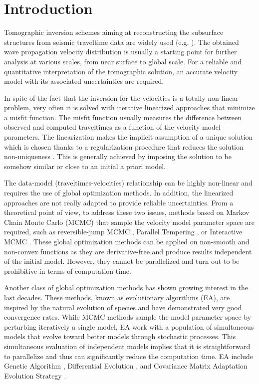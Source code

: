\def\thefigures{chap4_tomographie/figures}


\section{Introduction}
\label{sec:introduction}

Tomographic inversion schemes aiming at reconstructing the subsurface structures from seismic traveltime data are widely used (e.g. \cite{Rawlinson2010}). The obtained wave propagation velocity distribution is usually a starting point for further analysis at various scales, from near surface to global scale. For a reliable and quantitative interpretation of the tomographic solution, an accurate velocity model with its associated uncertainties are required.

In spite of the fact that the inversion for the velocities is a totally non-linear problem, very often it is solved with iterative linearized approaches that minimize a misfit function. The misfit function usually measures the difference between observed and computed traveltimes as a function of the velocity model parameters. The linearization makes the implicit assumption of a unique solution which is chosen thanks to a regularization procedure that reduces the solution non-uniqueness \citep{Menke2012}. This is generally achieved by imposing the solution to be somehow similar or close to an initial a priori model.

The data-model (traveltimes-velocities) relationship can be highly non-linear and requires the use of global optimization methods. In addition, the linearized approaches are not really adapted to provide reliable uncertainties. From a theoretical point of view, to address these two issues, methods based on Markov Chain Monte Carlo (MCMC) that sample the velocity model parameter space are required, such as reversible-jump MCMC \citep{Green1995, Bodin2009}, Parallel Tempering \citep{Sambridge2014}, or Interactive MCMC \citep{Bottero2016}. These global optimization methods can be applied on non-smooth and non-convex functions as they are derivative-free and produce results independent of the initial model. However, they cannot be parallelized and turn out to be prohibitive in terms of computation time.

Another class of global optimization methods has shown growing interest in the last decades. These methods, known as evolutionary algorithms (EA), are inspired by the natural evolution of species and have demonstrated very good convergence rates. While MCMC methods sample the model parameter space by perturbing iteratively a single model, EA work with a population of simultaneous models that evolve toward better models through stochastic processes. This simultaneous evaluation of independent models implies that it is straightforward to parallelize and thus can significantly reduce the computation time. EA include Genetic Algorithm \citep{Sambridge1992a, Whitley1994}, Differential Evolution \citep{Storn1997, Barros2015}, and Covariance Matrix Adaptation Evolution Strategy \citep{Hansen1996, Grayver2016}.

